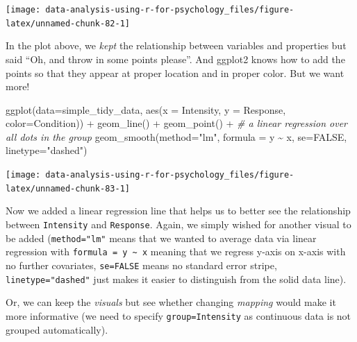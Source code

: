 \documentclass[
]{book}
\newenvironment{Shaded}{\begin{snugshade}}{\end{snugshade}}
\newcommand{\AttributeTok}[1]{\textcolor[rgb]{0.77,0.63,0.00}{#1}}
\newcommand{\CommentTok}[1]{\textcolor[rgb]{0.56,0.35,0.01}{\textit{#1}}}
\newcommand{\ConstantTok}[1]{\textcolor[rgb]{0.00,0.00,0.00}{#1}}
\newcommand{\FunctionTok}[1]{\textcolor[rgb]{0.00,0.00,0.00}{#1}}
\newcommand{\NormalTok}[1]{#1}
\newcommand{\SpecialCharTok}[1]{\textcolor[rgb]{0.00,0.00,0.00}{#1}}
\newcommand{\StringTok}[1]{\textcolor[rgb]{0.31,0.60,0.02}{#1}}
\begin{document}
\begin{center}\texttt{[image: data-analysis-using-r-for-psychology\_files/figure-latex/unnamed-chunk-82-1]} \end{center}

In the plot above, we \emph{kept} the relationship between variables and properties but said ``Oh, and throw in some points please''. And ggplot2 knows how to add the points so that they appear at proper location and in proper color. But we want more!

\begin{Shaded}
\begin{Highlighting}[]
\FunctionTok{ggplot}\NormalTok{(}\AttributeTok{data=}\NormalTok{simple\_tidy\_data, }\FunctionTok{aes}\NormalTok{(}\AttributeTok{x =}\NormalTok{ Intensity, }\AttributeTok{y =}\NormalTok{ Response, }\AttributeTok{color=}\NormalTok{Condition)) }\SpecialCharTok{+} 
  \FunctionTok{geom\_line}\NormalTok{() }\SpecialCharTok{+}
  \FunctionTok{geom\_point}\NormalTok{() }\SpecialCharTok{+}
  \CommentTok{\# a linear regression over all dots in the group}
  \FunctionTok{geom\_smooth}\NormalTok{(}\AttributeTok{method=}\StringTok{"lm"}\NormalTok{, }\AttributeTok{formula =}\NormalTok{ y }\SpecialCharTok{\textasciitilde{}}\NormalTok{ x, }\AttributeTok{se=}\ConstantTok{FALSE}\NormalTok{, }\AttributeTok{linetype=}\StringTok{"dashed"}\NormalTok{) }
\end{Highlighting}
\end{Shaded}

\begin{center}\texttt{[image: data-analysis-using-r-for-psychology\_files/figure-latex/unnamed-chunk-83-1]} \end{center}

Now we added a linear regression line that helps us to better see the relationship between \texttt{Intensity} and \texttt{Response}. Again, we simply wished for another visual to be added (\texttt{method="lm"} means that we wanted to average data via linear regression with \texttt{formula\ =\ y\ \textasciitilde{}\ x} meaning that we regress y-axis on x-axis with no further covariates, \texttt{se=FALSE} means no standard error stripe, \texttt{linetype="dashed"} just makes it easier to distinguish from the solid data line).

Or, we can keep the \emph{visuals} but see whether changing \emph{mapping} would make it more informative (we need to specify \texttt{group=Intensity} as continuous data is not grouped automatically).
\end{document}
